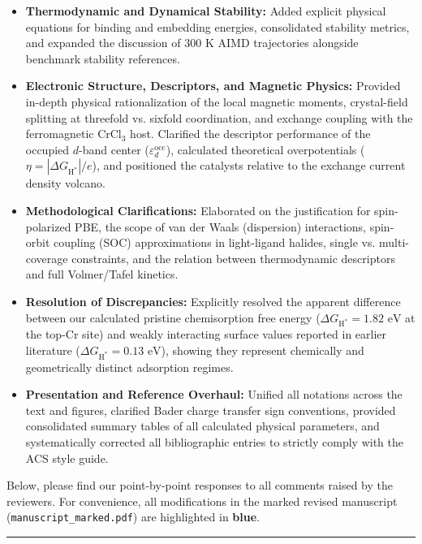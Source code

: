 \documentclass[11pt, sans, a4paper]{moderncv}
\begin{document}
\begin{itemize}[leftmargin=1.5em, itemsep=0.3em]
  \item \textbf{Thermodynamic and Dynamical Stability:} Added explicit physical equations for binding and embedding energies, consolidated stability metrics, and expanded the discussion of $300\text{ K}$ AIMD trajectories alongside benchmark stability references.
  \item \textbf{Electronic Structure, Descriptors, and Magnetic Physics:} Provided in-depth physical rationalization of the local magnetic moments, crystal-field splitting at threefold vs. sixfold coordination, and exchange coupling with the ferromagnetic $\text{CrCl}_3$ host. Clarified the descriptor performance of the occupied $d$-band center ($\varepsilon_d^{\mathrm{occ}}$), calculated theoretical overpotentials ($\eta = |\Delta G_{\mathrm{H}^*}|/e$), and positioned the catalysts relative to the exchange current density volcano.
  \item \textbf{Methodological Clarifications:} Elaborated on the justification for spin-polarized PBE, the scope of van der Waals (dispersion) interactions, spin-orbit coupling (SOC) approximations in light-ligand halides, single vs. multi-coverage constraints, and the relation between thermodynamic descriptors and full Volmer/Tafel kinetics.
  \item \textbf{Resolution of Discrepancies:} Explicitly resolved the apparent difference between our calculated pristine chemisorption free energy ($\Delta G_{\mathrm{H}^*} = 1.82\text{ eV}$ at the top-Cr site) and weakly interacting surface values reported in earlier literature ($\Delta G_{\mathrm{H}^*} = 0.13\text{ eV}$), showing they represent chemically and geometrically distinct adsorption regimes.
  \item \textbf{Presentation and Reference Overhaul:} Unified all notations across the text and figures, clarified Bader charge transfer sign conventions, provided consolidated summary tables of all calculated physical parameters, and systematically corrected all bibliographic entries to strictly comply with the ACS style guide.
\end{itemize}

Below, please find our point-by-point responses to all comments raised by the reviewers. For convenience, all modifications in the marked revised manuscript (\texttt{manuscript\_marked.pdf}) are highlighted in \textbf{\color{blue}blue}.

\vspace{1.5em}
\noindent\rule{\textwidth}{0.6pt}
\end{document}
